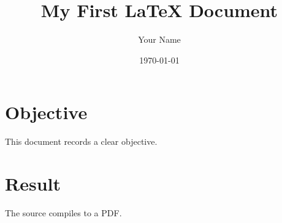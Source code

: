 \documentclass{article}
\title{My First \LaTeX{} Document}
\author{Your Name}
\date{\today}
\begin{document}
\maketitle

\section{Objective}
This document records a clear objective.

\section{Result}
The source compiles to a PDF.
\end{document}

